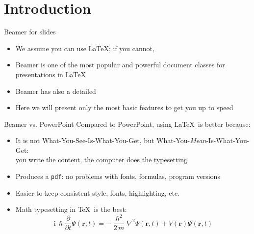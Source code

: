 \section{Introduction}

\begin{frame}{Beamer for slides}
\begin{itemize}
    \item We assume you can use \LaTeX; if you cannot,
    \item Beamer is one of the most popular and powerful document classes for presentations in \LaTeX
    \item Beamer has also a detailed
    \item Here we will present only the most basic features to get you up to speed
\end{itemize}
\end{frame}


\begin{frame}{Beamer vs. PowerPoint}
Compared to PowerPoint, using \LaTeX\ is better because:
\begin{itemize}
    \item It is not What-You-See-Is-What-You-Get, but What-You-\emph{Mean}-Is-What-You-Get:\\ you write the content, the computer does the typesetting
    \item Produces a \texttt{pdf}: no problems with fonts, formulas, program versions
    \item Easier to keep consistent style, fonts, highlighting, etc.
    \item Math typesetting in \TeX\ is the best:
\begin{equation*}
    \mathrm{i}\,\hslash\frac{\partial}{\partial t} \Psi(\mathbf{r},t) = -\frac{\hslash^2}{2\,m}\nabla^2\Psi(\mathbf{r},t) + V(\mathbf{r})\Psi(\mathbf{r},t)
\end{equation*}
\end{itemize}
\end{frame}


